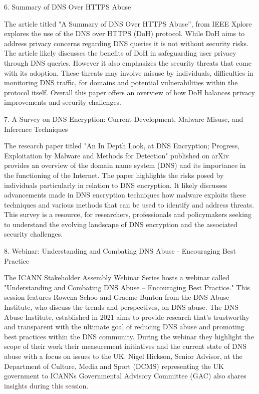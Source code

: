 6. Summary of DNS Over HTTPS Abuse

The article titled "A Summary of DNS Over HTTPS Abuse”, from IEEE Xplore explores the use of the DNS over HTTPS (DoH) protocol. While DoH aims to address privacy concerns regarding DNS queries it is not without security risks. The article likely discusses the benefits of DoH in safeguarding user privacy through DNS queries. However it also emphasizes the security threats that come with its adoption. These threats may involve misuse by individuals, difficulties in monitoring DNS traffic, for domains and potential vulnerabilities within the protocol itself. Overall this paper offers an overview of how DoH balances privacy improvements and security challenges.


7. A Survey on DNS Encryption: Current Development, Malware Misuse, and Inference Techniques

The research paper titled "An In Depth Look, at DNS Encryption; Progress, Exploitation by Malware and Methods for Detection" published on arXiv provides an overview of the domain name system (DNS) and its importance in the functioning of the Internet. The paper highlights the risks posed by individuals particularly in relation to DNS encryption. It likely discusses advancements made in DNS encryption techniques how malware exploits these techniques and various methods that can be used to identify and address threats. This survey is a resource, for researchers, professionals and policymakers seeking to understand the evolving landscape of DNS encryption and the associated security challenges.




8. Webinar: Understanding and Combating DNS Abuse - Encouraging Best Practice

The ICANN Stakeholder Assembly Webinar Series hosts a webinar called "Understanding and Combating DNS Abuse – Encouraging Best Practice." This session features Rowena Schoo and Graeme Bunton from the DNS Abuse Institute, who discuss the trends and perspectives, on DNS abuse. The DNS Abuse Institute, established in 2021 aims to provide research that's trustworthy and transparent with the ultimate goal of reducing DNS abuse and promoting best practices within the DNS community. During the webinar they highlight the scope of their work their measurement initiatives and the current state of DNS abuse with a focus on issues to the UK. Nigel Hickson, Senior Advisor, at the Department of Culture, Media and Sport (DCMS) representing the UK government to ICANNs Governmental Advisory Committee (GAC) also shares insights during this session.







